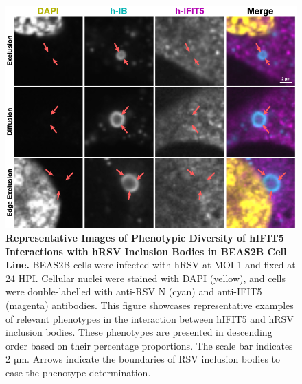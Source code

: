 \begin{figure}
    \centering
    \includegraphics[width=1\linewidth]{08. Chapter 3/Figs/02. Infection/04. IFIT5/06. beas2b i5.pdf}
    \caption[Representative Images of Phenotypic Diversity of hIFIT5 Interactions with hRSV Inclusion Bodies in BEAS2B Cell Line.]{\textbf{Representative Images of Phenotypic Diversity of hIFIT5 Interactions with hRSV Inclusion Bodies in BEAS2B Cell Line.} BEAS2B cells were infected with hRSV at MOI 1 and fixed at 24 HPI. Cellular nuclei were stained with DAPI (yellow), and cells were double-labelled with anti-RSV N (cyan) and anti-IFIT5 (magenta) antibodies. This figure showcases representative examples of relevant phenotypes in the interaction between hIFIT5 and hRSV inclusion bodies. These phenotypes are presented in descending order based on their percentage proportions. The scale bar indicates 2 µm.  Arrows indicate the boundaries of RSV inclusion bodies to ease the phenotype determination.}
    \label{fig:Representative Images of Phenotypic Diversity of hIFIT5 Interactions with hRSV Inclusion Bodies in BEAS2B Cell Line}
\end{figure}

